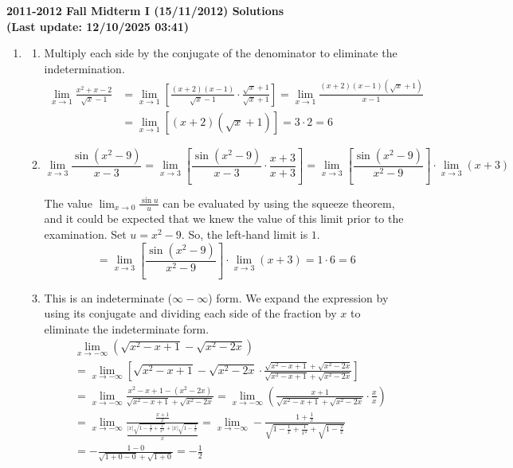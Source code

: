 \documentclass[a4paper, 12pt]{article}
\renewcommand{\headrulewidth}{0pt}
\begin{document}
\newpage
\pagestyle{fancy}
\renewcommand{\headrulewidth}{1pt}


\begin{center}
\textbf{2011-2012 Fall Midterm I (15/11/2012) Solutions\\
(Last update: 12/10/2025 03:41)}
\end{center}

\begin{enumerate}[leftmargin=*,label=\textbf{\arabic*.}]
\item
\begin{enumerate}[leftmargin=*,label=\textbf{\alph*.}]
\item Multiply each side by the conjugate of the denominator to eliminate the indetermination.
\begin{align*}
\lim_{x\to1}\frac{x^2+x-2}{\sqrt x -1}&=\lim_{x\to1}\left[\frac{(x+2)(x-1)}{\sqrt x -1}\cdot \frac{\sqrt x + 1}{\sqrt x +1}\right]=\lim_{x\to1}\frac{(x+2)(x-1)\left(\sqrt x + 1\right)}{x-1}\\[1em]&=\lim_{x\to1}\left[(x+2)\left(\sqrt x + 1\right)\right] =3\cdot 2 = \boxed6
\end{align*}

\item
\[\lim_{x\to 3}\frac{\sin(x^2-9)}{x-3}=\lim_{x\to 3}\left[\frac{\sin(x^2-9)}{x-3}\cdot\frac{x+3}{x+3}\right]=\lim_{x\to3}\left[\frac{\sin(x^2-9)}{x^2-9}\right]\cdot\lim_{x\to 3}(x+3)\]

The value $\displaystyle \lim_{x\to0}\frac{\sin u}{u}$ can be evaluated by using the squeeze theorem, and it could be expected that we knew the value of this limit prior to the examination. Set $u=x^2-9$. So, the left-hand limit is $1$.
\[=\lim_{x\to3}\left[\frac{\sin(x^2-9)}{x^2-9}\right]\cdot\lim_{x\to 3}(x+3) = 1\cdot 6 = \boxed6\]

\item This is an indeterminate ($\infty - \infty$) form. We expand the expression by using its conjugate and dividing each side of the fraction by $x$ to eliminate the indeterminate form.
\begin{align*}&\lim_{x\to -\infty}\left(\sqrt{x^2-x+1}-\sqrt{x^2-2x}\right)\\[1em]&=\lim_{x\to -\infty}\left[\sqrt{x^2-x+1}-\sqrt{x^2-2x}\cdot\frac{\sqrt{x^2-x+1}+\sqrt{x^2-2x}}{\sqrt{x^2-x+1}+\sqrt{x^2-2x}}\right]\\[1em]&=\lim_{x\to-\infty}\frac{x^2-x+1-\left(x^2-2x\right)}{\sqrt{x^2-x+1}+\sqrt{x^2-2x}}=\lim_{x\to-\infty}\left(\frac{x+1}{\sqrt{x^2-x+1}+\sqrt{x^2-2x}}\cdot\frac{x}{x}\right)\\[1em]&=\lim_{x\to-\infty}\frac{\displaystyle\frac{x+1}x}{\displaystyle\frac{|x|\sqrt{1-\frac1x+\frac1{x^2}}+|x|\sqrt{1-\frac1x}}x}=\lim_{x\to-\infty}-\frac{\displaystyle1+\frac{1}x}{\displaystyle\sqrt{1-\frac1x+\frac1{x^2}}+\sqrt{1-\frac2x}}\\[1em]&=-\frac{1-0}{\sqrt{1+0-0}+\sqrt{1+0}}=\boxed{-\frac12}\end{align*}
\end{enumerate}


\end{enumerate}
\end{document}
